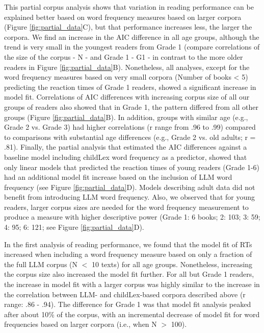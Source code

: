 \documentclass[doc, a4paper, anonymous]{apa7}
\begin{document}
This partial corpus analysis shows that variation in reading performance can be explained better based on word frequency measures based on larger corpora (Figure \ref{fig:partial_data}C), but that performance increases less, the larger the corpora. We find an increase in the AIC difference in all age groups, although the trend is very small in the youngest readers from Grade 1 (compare correlations of the size of the corpus - N - and Grade 1 - G1 - in contrast to the more older readers in Figure \ref{fig:partial_data}B). Nonetheless, all analyses, except for the word frequency measures based on very small corpora (Number of books < 5) predicting the reaction times of Grade 1 readers, showed a significant increase in model fit. Correlations of AIC differences with increasing corpus size of all our groups of readers also showed that in Grade 1, the pattern differed from all other groups (Figure \ref{fig:partial_data}B). In addition, groups with similar age (e.g., Grade 2 vs. Grade 3) had higher correlations (r range from .96 to .99) compared to comparisons with substantial age differences (e.g., Grade 2 vs. old adults; r = .81). Finally, the partial analysis that estimated the AIC differences against a baseline model including childLex word frequency as a predictor, showed that only linear models that predicted the reaction times of young readers (Grade 1-6) had an additional model fit increase based on the inclusion of LLM word frequency (see Figure \ref{fig:partial_data}D). Models describing adult data did not benefit from introducing LLM word frequency. Also, we observed that for young readers, larger corpus sizes are needed for the word frequency measurement to produce a measure with higher descriptive power (Grade 1: 6 books; 2: 103; 3: 59; 4: 95; 6: 121; see Figure \ref{fig:partial_data}D).


In the first analysis of reading performance, we found that the model fit of RTs increased when including a word frequency measure based on only a fraction of the full LLM corpus (N $<$ 10 texts) for all age groups. Nonetheless, increasing the corpus size also increased the model fit further. For all but Grade 1 readers, the increase in model fit with a larger corpus was highly similar to the increase in the correlation between LLM- and childLex-based corpora described above (r range: .86 - .94). The difference for Grade 1 was that model fit analysis peaked after about 10\% of the corpus, with an incremental decrease of model fit for word frequencies based on larger corpora (i.e., when N $>$ 100). 
\end{document}

